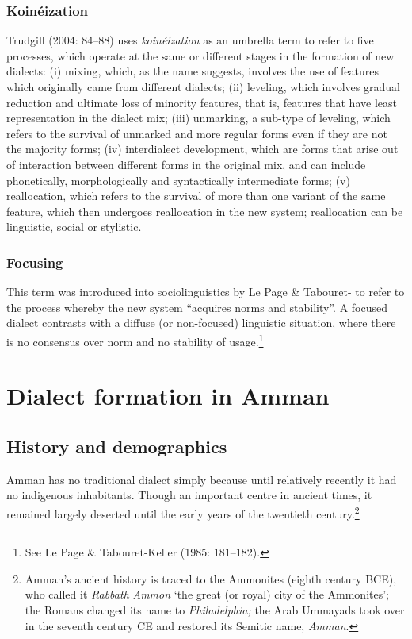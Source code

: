 \documentclass[output=paper]{langsci/langscibook}
\begin{document}
\subsubsection{Koinéization}

Trudgill (2004: 84–88) uses \textit{koinéization} as an umbrella term to refer to five processes, which operate at the same or different stages in the formation of new dialects: (i) mixing, which, as the name suggests, involves the use of features which originally came from different dialects; (ii) leveling, which involves gradual reduction and ultimate loss of minority features, that is, features that have least representation in the dialect mix; (iii) unmarking, a sub-type of leveling, which refers to the survival of unmarked and more regular forms even if they are not the majority forms; (iv) interdialect development, which are forms that arise out of interaction between different forms in the original mix, and can include phonetically, morphologically and syntactically  intermediate forms; (v) reallocation, which refers to the survival of more than one variant of the same feature, which then undergoes reallocation in the new system; reallocation can be linguistic, social or stylistic.

\subsubsection{Focusing} \label{focus}

This term was introduced into sociolinguistics by Le Page \& Tabouret-\citet{Keller1985} to refer to the process whereby the new system “acquires norms and stability”. A focused dialect contrasts with a diffuse (or non-focused) linguistic situation, where there is no consensus over norm and no stability of usage.\footnote{See Le Page \& Tabouret-Keller (1985: 181–182).}

\section{Dialect formation in Amman}

\subsection{History and demographics}

Amman has no traditional dialect simply because until relatively recently it had no indigenous inhabitants. Though an important centre in ancient times, it remained largely deserted until the early years of the twentieth century.\footnote{Amman’s ancient history is traced to the Ammonites (eighth century BCE), who called it \textit{Rabbath} \textit{Ammon} ‘the great (or royal) city of the Ammonites’; the Romans changed its name to \textit{Philadelphia;} the Arab Ummayads took over in the seventh century CE and restored its Semitic name, \textit{Amman}.}
\end{document}
